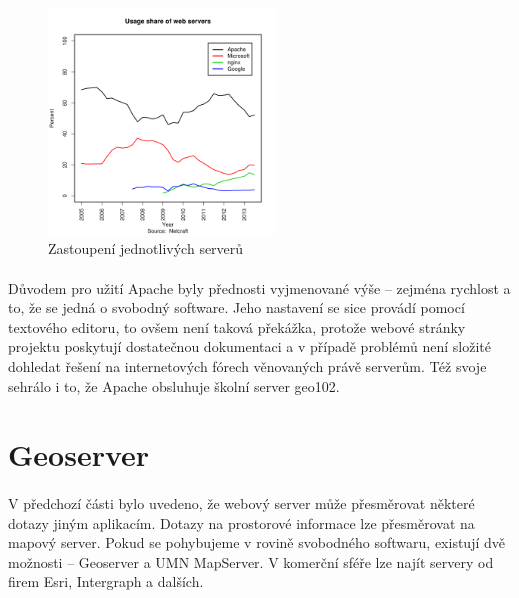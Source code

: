 \documentclass[11pt,a4paper,titlepage,oneside]{book}
\begin{document}
		\begin{figure}[!h]
			\begin{center}
				\includegraphics[width=6cm]{obrazky/servers_share.png}
				\caption{Zastoupení jednotlivých serverů}
			\end{center}
		\end{figure}

		\paragraph{} Důvodem pro užití Apache byly přednosti vyjmenované výše -- zejména rychlost a to, že se jedná o svobodný software. Jeho nastavení se sice provádí pomocí textového editoru, to ovšem není taková překážka, protože webové stránky projektu poskytují dostatečnou dokumentaci a v případě problémů není složité dohledat řešení na internetových fórech věnovaných právě serverům. Též svoje sehrálo i to, že Apache obsluhuje školní server geo102.

	\section{Geoserver}
		\paragraph{} V předchozí části bylo uvedeno, že webový server může přesměrovat některé dotazy jiným aplikacím. Dotazy na prostorové informace lze přesměrovat na mapový server. Pokud se pohybujeme v rovině svobodného softwaru, existují dvě možnosti -- Geoserver a UMN MapServer. V komerční sféře lze najít servery od firem Esri, Intergraph a dalších. 

\end{document}

